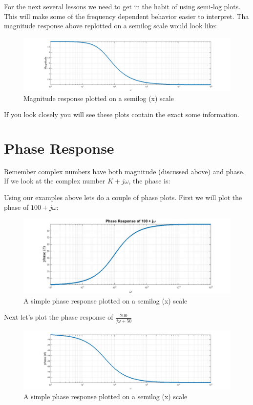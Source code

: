 \documentclass{handout}
\begin{document}
For the next several lessons we need to get in the habit of using semi-log plots.  This will make some of the frequency dependent behavior easier to interpret.  Tha magnitude response above replotted on a semilog scale would look like:
\begin{figure} [h!]
\centering
\includegraphics[width=1\textwidth]{MagResponse3.jpg}
\caption{Magnitude response plotted on a semilog (x) scale}
\label{fig: MagResponse3}
\end{figure}

If you look closely you will see these plots contain the exact some information.
\newpage
\clearpage
\pagebreak
\section{Phase Response}
Remember complex numbers have both magnitude (discussed above) and phase.  If we look at the complex number $K+j\omega$, the phase is:
\soln{1in}{
\[
\theta=\tan^{-1}\left(\frac{\omega}{K} \right)
\]
}

Using our examples above lets do a couple of phase plots.  First we will plot the phase of $100+j\omega$:
\begin{figure} [h!]
\centering
\includegraphics[width=1\textwidth]{PhaseResponse1.jpg}
\caption{A simple phase response plotted on a semilog (x) scale}
\label{fig: PhaseResponse1}
\end{figure}

Next let's plot the phase response of $\frac{200}{j\omega +50}$
\begin{figure} [h!]
\centering
\includegraphics[width=1\textwidth]{PhaseResponse2.jpg}
\caption{A simple phase response plotted on a semilog (x) scale}
\label{fig: PhaseResponse2}
\end{figure}
\newpage
\clearpage
\pagebreak
\end{document}
